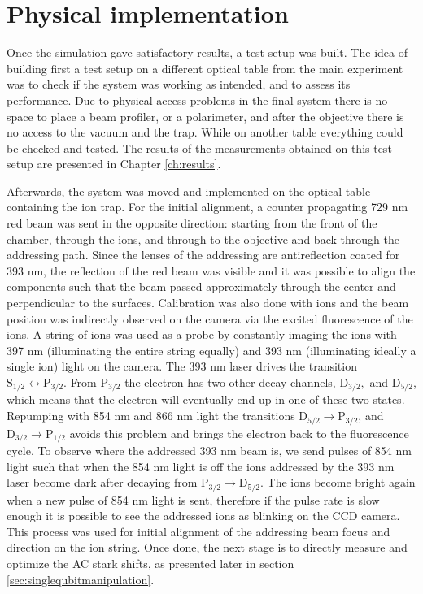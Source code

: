 \section{Physical implementation}
\label{design4}
Once the simulation gave satisfactory results, a test setup was built. The idea of building first a test setup on a different optical table from the main experiment was to check if the system was working as intended, and to assess its performance. Due to physical access problems in the final system there is no space to place a beam profiler, or a polarimeter, and after the objective there is no access to the vacuum and the trap. While on another table everything could be checked and tested. The results of the measurements obtained on this test setup are presented in Chapter \ref{ch:results}.\par
Afterwards, the system was moved and implemented on the optical table containing the ion trap. For the initial alignment, a counter propagating 729 nm red beam was sent in the opposite direction: starting from the front of the chamber, through the ions, and through to the objective and back through the addressing path. Since the lenses of the addressing are antireflection coated for 393 nm, the reflection of the red beam was visible and it was possible to align the components such that the beam passed approximately through the center and perpendicular to the surfaces. Calibration was also done with ions and the beam position was indirectly observed on the camera via the excited fluorescence of the ions. A string of ions was used as a probe by constantly imaging the ions with 397 nm (illuminating the entire string equally) and 393 nm (illuminating ideally a single ion) light on the camera. The 393 nm laser drives the transition $\text{S}_{1/2}\leftrightarrow \text{P}_{3/2}$. From $\text{P}_{3/2}$ the electron has two other decay channels, $\text{D}_{3/2},$ and $\text{D}_{5/2}$, which means that the electron will eventually end up in one of these two states. Repumping with 854 nm and 866 nm light the transitions $\text{D}_{5/2}\to \text{P}_{3/2}$, and $\text{D}_{3/2}\to \text{P}_{1/2}$ avoids this problem and brings the electron back to the fluorescence cycle. To observe where the addressed 393 nm beam is, we send pulses of 854 nm light
such that when the 854 nm light is off the ions addressed by the 393 nm laser become dark after decaying from $\text{P}_{3/2}\to  \text{D}_{5/2}$. The ions become bright again when a new pulse of 854 nm light is sent, therefore if the pulse rate is slow enough it is possible to see the addressed ions as blinking on the CCD camera. This process was used for initial alignment of the addressing beam focus and direction on the ion string. Once done, the next stage is to directly measure and optimize the AC stark shifts, as presented later in section \ref{sec:singlequbitmanipulation}.\par
